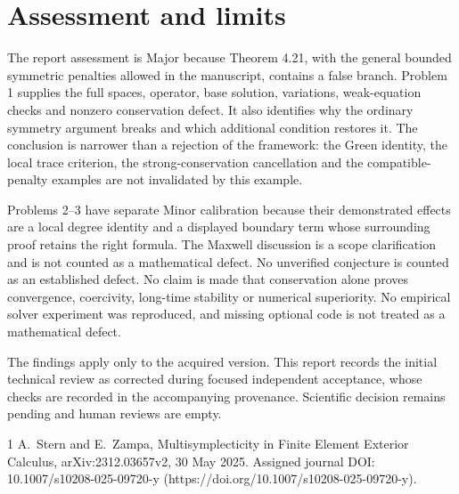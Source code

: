 \documentclass[10pt]{article}
\begin{document}
\section*{Assessment and limits}
The report assessment is Major because Theorem 4.21, with the general bounded symmetric penalties allowed in the manuscript, contains a false branch. Problem 1 supplies the full spaces, operator, base solution, variations, weak-equation checks and nonzero conservation defect. It also identifies why the ordinary symmetry argument breaks and which additional condition restores it. The conclusion is narrower than a rejection of the framework: the Green identity, the local trace criterion, the strong-conservation cancellation and the compatible-penalty examples are not invalidated by this example.\par
Problems 2–3 have separate Minor calibration because their demonstrated effects are a local degree identity and a displayed boundary term whose surrounding proof retains the right formula. The Maxwell discussion is a scope clarification and is not counted as a mathematical defect. No unverified conjecture is counted as an established defect. No claim is made that conservation alone proves convergence, coercivity, long-time stability or numerical superiority. No empirical solver experiment was reproduced, and missing optional code is not treated as a mathematical defect.\par
The findings apply only to the acquired version. This report records the initial technical review as corrected during focused independent acceptance, whose checks are recorded in the accompanying provenance. Scientific decision remains pending and human reviews are empty.\par
1 A. Stern and E. Zampa, Multisymplecticity in Finite Element Exterior Calculus, arXiv:2312.03657v2, 30 May 2025. Assigned journal DOI: 10.1007/s10208-025-09720-y (https://doi.org/10.1007/s10208-025-09720-y).\par
\end{document}
